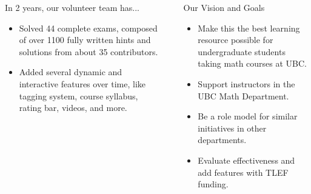 \documentclass[final]{beamer}
\newlength{\sepwid}
\newlength{\onecolwid}
\begin{document}
\begin{frame}[t]
\begin{columns}[t]
\begin{column}{\onecolwid}
\begin{block}{In 2 years, our volunteer team has...}
        \begin{itemize}
            \item Solved 44 complete exams, composed of over 1100 fully written hints and solutions from about 35 contributors.
            \item Added several dynamic and interactive features over time, like tagging system, course syllabus, rating bar, videos, and more.
                    \end{itemize}
\end{block}


\end{column} %
%
%

\begin{column}{\sepwid}\end{column} %

\begin{column}{\onecolwid} %

\begin{alertblock}{Our Vision and Goals}
\begin{itemize}
\item Make this the best learning resource possible for undergraduate students taking math courses at UBC. %

\item Support instructors in the UBC Math Department.

\item Be a role model for similar initiatives in other departments.

\item Evaluate effectiveness and add features with TLEF funding.
\end{itemize}
\end{alertblock}



\end{column}
\end{columns}
\end{frame}
\end{document}
